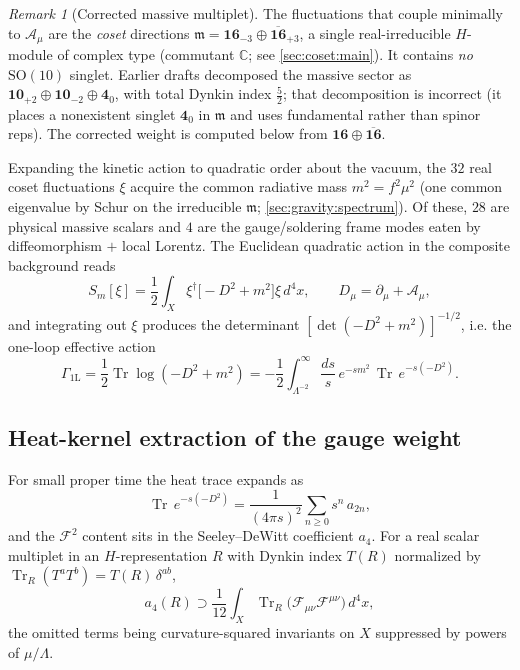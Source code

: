 \documentclass[11pt]{article}
\theoremstyle{plain}
\theoremstyle{definition}
\theoremstyle{remark}
\newtheorem{remark}[theorem]{Remark}
\newcommand{\SO}[1]{\mathrm{SO}(#1)}
\newcommand{\Tr}{\operatorname{Tr}}
\newcommand{\SOTen}{\SO{10}}
\begin{document}
\begin{remark}[Corrected massive multiplet]\label{rem:app-ym:multiplet}
The fluctuations that couple minimally to $\mathcal A_{\mu}$ are the
\emph{coset} directions $\mathfrak m=\mathbf{16}_{-3}\oplus
\overline{\mathbf{16}}_{+3}$, a single real-irreducible $H$-module of
complex type (commutant $\mathbb C$; see
\autoref{sec:coset:main}). It contains \emph{no} $\SOTen$
singlet. Earlier drafts decomposed the massive sector as
$\mathbf{10}_{+2}\oplus\mathbf{10}_{-2}\oplus\mathbf 4_{0}$, with total
Dynkin index $\tfrac52$; that decomposition is incorrect (it places a
nonexistent singlet $\mathbf 4_{0}$ in $\mathfrak m$ and uses
fundamental rather than spinor reps). The corrected weight is computed
below from $\mathbf{16}\oplus\overline{\mathbf{16}}$.
\end{remark}

Expanding the kinetic action to quadratic order about the vacuum, the
$32$ real coset fluctuations $\xi$ acquire the common radiative mass
$m^{2}=f^{2}\mu^{2}$ (one common eigenvalue by Schur on the irreducible
$\mathfrak m$; \autoref{sec:gravity:spectrum}). Of these, $28$ are
physical massive scalars and $4$ are the gauge/soldering frame modes
eaten by diffeomorphism $+$ local Lorentz. The Euclidean quadratic
action in the composite background reads
\begin{equation}\label{eq:app-ym:Squad}
  S_{m}[\xi]
  =\frac12\int_{X}\xi^{\dagger}\bigl[-D^{2}+m^{2}\bigr]\xi\,d^{4}x,
  \qquad
  D_{\mu}=\partial_{\mu}+\mathcal A_{\mu},
\end{equation}
and integrating out $\xi$ produces the determinant
$[\det(-D^{2}+m^{2})]^{-1/2}$, i.e. the one-loop effective action
\begin{equation}\label{eq:app-ym:W}
  \Gamma_{\mathrm{1L}}
  =\frac12\Tr\log(-D^{2}+m^{2})
  =-\frac12\int_{\Lambda^{-2}}^{\infty}\frac{ds}{s}\,
    e^{-sm^{2}}\,\Tr\,e^{-s(-D^{2})}.
\end{equation}

\subsection{Heat-kernel extraction of the gauge weight}
\label{sec:app-ym:heatkernel}

For small proper time the heat trace expands as
\begin{equation}\label{eq:app-ym:HK}
  \Tr\,e^{-s(-D^{2})}
  =\frac{1}{(4\pi s)^{2}}\sum_{n\ge0}s^{n}\,a_{2n},
\end{equation}
and the $\mathcal F^{2}$ content sits in the Seeley--DeWitt coefficient
$a_{4}$. For a real scalar multiplet in an $H$-representation $R$ with
Dynkin index $T(R)$ normalized by
$\Tr_{R}(T^{a}T^{b})=T(R)\,\delta^{ab}$,
\begin{equation}\label{eq:app-ym:a4}
  a_{4}(R)\supset
  \frac{1}{12}\int_{X}\Tr_{R}\bigl(\mathcal F_{\mu\nu}
  \mathcal F^{\mu\nu}\bigr)\,d^{4}x ,
\end{equation}
the omitted terms being curvature-squared invariants on $X$ suppressed
by powers of $\mu/\Lambda$.
\end{document}

